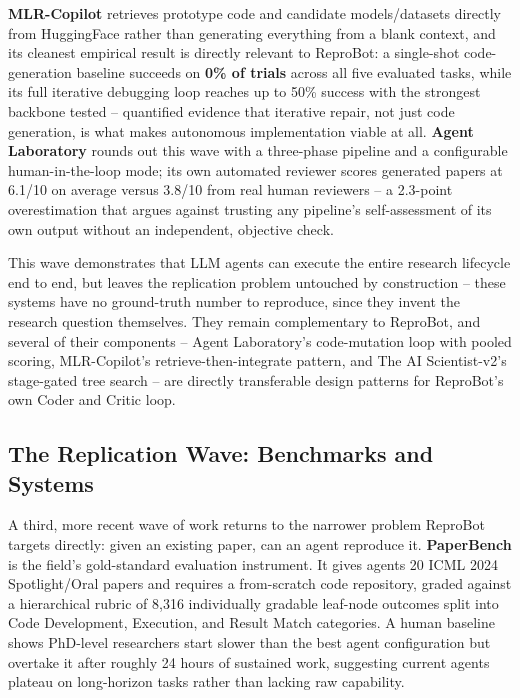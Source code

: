 \documentclass[11pt]{article}
\begin{document}
\textbf{MLR-Copilot} \cite{li2024mlrcopilot} retrieves prototype code and candidate
models/datasets directly from HuggingFace rather than generating everything from a blank
context, and its cleanest empirical result is directly relevant to ReproBot: a
single-shot code-generation baseline succeeds on \textbf{0\% of trials} across all five
evaluated tasks, while its full iterative debugging loop reaches up to 50\% success with
the strongest backbone tested -- quantified evidence that iterative repair, not just code
generation, is what makes autonomous implementation viable at all.
\textbf{Agent Laboratory} \cite{schmidgall2025agentlab} rounds out this wave with a
three-phase pipeline and a configurable human-in-the-loop mode; its own automated
reviewer scores generated papers at 6.1/10 on average versus 3.8/10 from real human
reviewers -- a 2.3-point overestimation that argues against trusting any pipeline's
self-assessment of its own output without an independent, objective check.

This wave demonstrates that LLM agents can execute the entire research lifecycle end to
end, but leaves the replication problem untouched by construction -- these systems have
no ground-truth number to reproduce, since they invent the research question themselves.
They remain complementary to ReproBot, and several of their components -- Agent
Laboratory's code-mutation loop with pooled scoring, MLR-Copilot's
retrieve-then-integrate pattern, and The AI Scientist-v2's stage-gated tree search --
are directly transferable design patterns for ReproBot's own Coder and Critic loop.

\subsection{The Replication Wave: Benchmarks and Systems}
\label{sec:replication-wave}

A third, more recent wave of work returns to the narrower problem ReproBot targets
directly: given an existing paper, can an agent reproduce it. \textbf{PaperBench}
\cite{starace2025paperbench} is the field's gold-standard evaluation instrument. It
gives agents 20 ICML 2024 Spotlight/Oral papers and requires a from-scratch code
repository, graded against a hierarchical rubric of 8,316 individually gradable
leaf-node outcomes split into Code Development, Execution, and Result Match categories.
A human baseline shows PhD-level researchers start slower than the best agent
configuration but overtake it after roughly 24 hours of sustained work, suggesting
current agents plateau on long-horizon tasks rather than lacking raw capability.
\end{document}

